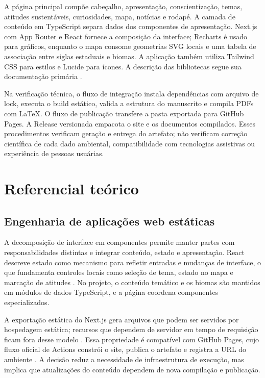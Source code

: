\documentclass[12pt,oneside,a4paper,brazil]{abntex2}
\begin{document}
A página principal compõe cabeçalho, apresentação, conscientização, temas, atitudes sustentáveis, curiosidades, mapa, notícias e rodapé. A camada de conteúdo em TypeScript separa dados dos componentes de apresentação. Next.js com App Router e React fornece a composição da interface; Recharts é usado para gráficos, enquanto o mapa consome geometrias SVG locais e uma tabela de associação entre siglas estaduais e biomas. A aplicação também utiliza Tailwind CSS para estilos e Lucide para ícones. A descrição das bibliotecas segue sua documentação primária \cite{reactstate,recharts}.

Na verificação técnica, o fluxo de integração instala dependências com arquivo de lock, executa o build estático, valida a estrutura do manuscrito e compila PDFs com LaTeX. O fluxo de publicação transfere a pasta exportada para GitHub Pages. A Release versionada empacota o site e os documentos compilados. Esses procedimentos verificam geração e entrega do artefato; não verificam correção científica de cada dado ambiental, compatibilidade com tecnologias assistivas ou experiência de pessoas usuárias.


\chapter{Referencial teórico}
\section{Engenharia de aplicações web estáticas}
A decomposição de interface em componentes permite manter partes com responsabilidades distintas e integrar conteúdo, estado e apresentação. React descreve estado como mecanismo para refletir entradas e mudanças de interface, o que fundamenta controles locais como seleção de tema, estado no mapa e marcação de atitudes \cite{reactstate}. No projeto, o conteúdo temático e os biomas são mantidos em módulos de dados TypeScript, e a página coordena componentes especializados.

A exportação estática do Next.js gera arquivos que podem ser servidos por hospedagem estática; recursos que dependem de servidor em tempo de requisição ficam fora desse modelo \cite{nextstatic}. Essa propriedade é compatível com GitHub Pages, cujo fluxo oficial de Actions constrói o site, publica o artefato e registra a URL do ambiente \cite{ghpages}. A decisão reduz a necessidade de infraestrutura de execução, mas implica que atualizações do conteúdo dependem de nova compilação e publicação.
\end{document}
